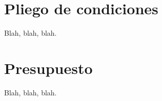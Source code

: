 
\chapter{Pliego de condiciones}
\label{cha:pliego}

Blah, blah, blah.

\chapter{Presupuesto}
\label{cha:presupuesto}


Blah, blah, blah.
